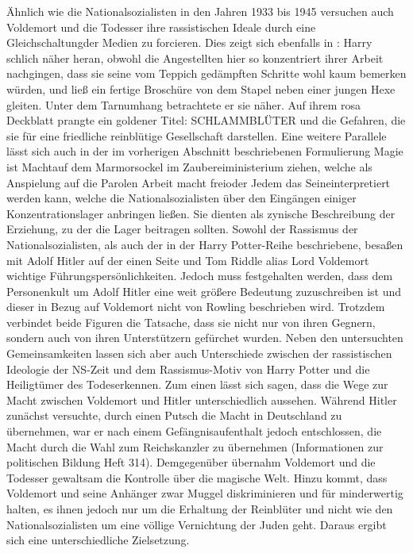 Ähnlich wie die Nationalsozialisten in den Jahren 1933 bis 1945 versuchen auch Voldemort und die Todesser ihre rassistischen Ideale durch eine \glqq Gleichschaltung\grqq der Medien zu forcieren. Dies zeigt sich ebenfalls in \cite[S.256]{JKR10}: \glqq Harry schlich näher heran, obwohl die Angestellten hier so konzentriert ihrer Arbeit nachgingen, dass sie seine vom Teppich gedämpften Schritte wohl kaum bemerken würden, und ließ ein fertige Broschüre von dem Stapel neben einer jungen Hexe gleiten. Unter dem Tarnumhang betrachtete er sie näher. Auf ihrem rosa Deckblatt prangte ein goldener Titel: SCHLAMMBLÜTER und die Gefahren, die sie für eine friedliche reinblütige Gesellschaft darstellen\grqq. Eine weitere Parallele lässt sich auch in der im vorherigen Abschnitt beschriebenen Formulierung \glqq Magie ist Macht\grqq auf dem Marmorsockel im Zaubereiministerium ziehen, welche als Anspielung auf die Parolen  \glqq Arbeit macht frei\grqq oder \glqq Jedem das Seine\grqq interpretiert werden kann, welche die Nationalsozialisten über den Eingängen einiger Konzentrationslager anbringen ließen. Sie dienten als zynische Beschreibung der \glqq Erziehung\grqq, zu der die Lager beitragen sollten.
Sowohl der Rassismus der Nationalsozialisten, als auch der in der \glqq Harry Potter\grqq{}-Reihe beschriebene, besaßen mit Adolf Hitler auf der einen Seite und Tom Riddle alias Lord Voldemort wichtige Führungspersönlichkeiten. Jedoch muss festgehalten werden, dass dem Personenkult um Adolf Hitler eine weit größere Bedeutung zuzuschreiben ist und dieser in Bezug auf Voldemort nicht von Rowling beschrieben wird. Trotzdem verbindet beide Figuren die Tatsache, dass sie nicht nur von ihren Gegnern, sondern auch von ihren Unterstützern gefürchet wurden\cite[S.15]{JKR10}. 
Neben den untersuchten Gemeinsamkeiten lassen sich aber auch  Unterschiede zwischen der rassistischen Ideologie der NS-Zeit und dem Rassismus-Motiv von \glqq Harry Potter und die Heiligtümer des Todes\grqq erkennen. Zum einen lässt sich sagen, dass die Wege zur Macht zwischen Voldemort und Hitler unterschiedlich aussehen. Während Hitler zunächst versuchte, durch einen Putsch die Macht in Deutschland zu übernehmen, war er nach einem Gefängnisaufenthalt jedoch entschlossen, die Macht durch die Wahl zum Reichskanzler zu übernehmen (Informationen zur politischen Bildung Heft 314). Demgegenüber übernahm Voldemort und die Todesser gewaltsam die Kontrolle über die magische Welt\cite[S.13]{JKR10}. 
Hinzu kommt, dass Voldemort und seine Anhänger zwar Muggel diskriminieren und für minderwertig halten, es ihnen jedoch nur um die Erhaltung der Reinblüter und nicht wie den Nationalsozialisten um eine völlige Vernichtung der Juden geht\cite[S.43]{MW123}. Daraus ergibt sich eine unterschiedliche Zielsetzung.
